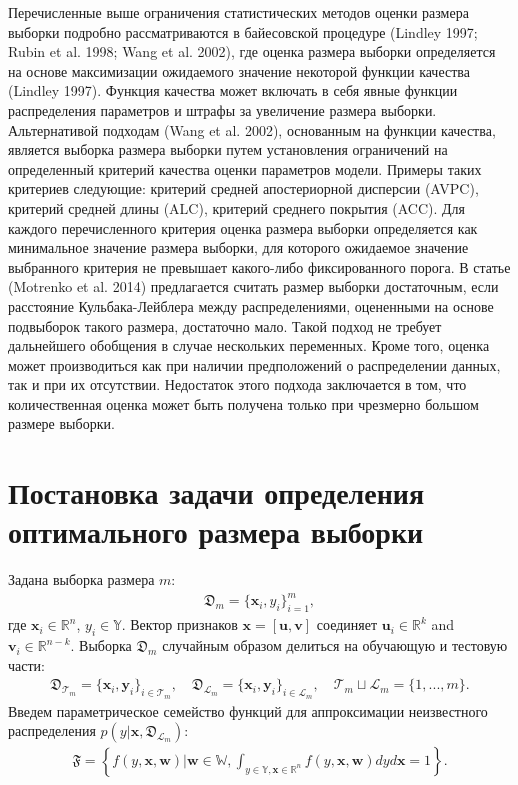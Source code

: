 Перечисленные выше ограничения статистических методов оценки размера выборки подробно рассматриваются в байесовской процедуре (Lindley 1997; Rubin et al. 1998; Wang et al. 2002), где оценка размера выборки определяется на основе максимизации ожидаемого значение некоторой функции качества (Lindley 1997). Функция качества может включать в себя явные функции распределения параметров и штрафы за увеличение размера выборки. Альтернативой подходам (Wang et al. 2002), основанным на функции качества, является выборка размера выборки путем установления ограничений на определенный критерий качества оценки параметров модели. Примеры таких критериев следующие: критерий средней апостериорной дисперсии (AVPC), критерий средней длины (ALC), критерий среднего покрытия (ACC). Для каждого перечисленного критерия оценка размера выборки определяется как минимальное значение размера выборки, для которого ожидаемое значение выбранного критерия не превышает какого-либо фиксированного порога. В статье (Motrenko et al. 2014) предлагается считать размер выборки достаточным, если расстояние Кульбака-Лейблера между распределениями, оцененными на основе подвыборок такого размера, достаточно мало. Такой подход не требует дальнейшего обобщения в случае нескольких переменных. Кроме того, оценка может производиться как при наличии предположений о распределении данных, так и при их отсутствии. Недостаток этого подхода заключается в том, что количественная оценка может быть получена только при чрезмерно большом размере выборки.

\section{Постановка задачи определения оптимального размера выборки}

Задана выборка размера $m$:
\[
\label{eq:ps:1}
\begin{aligned}
	\mathfrak{D}_{m} = \{\textbf{x}_i, y_i\}_{i = 1}^{m},
\end{aligned}
\]
где $\textbf{x}_i\in \mathbb{R}^{n}$, $y_i\in \mathbb{Y}$. Вектор признаков $\textbf{x} = [\textbf{u}, \textbf{v}]$ соединяет $\textbf{u}_i\in \mathbb{R}^{k}$ and $ \textbf{v}_i\in \mathbb{R}^{n-k}$.
Выборка $\mathfrak{D}_{m}$ случайным образом делиться на обучающую и тестовую части:
\[
\label{eq:ps:2}
\begin{aligned}
	\mathfrak{D}_{\mathcal{T}_{m}} = \{\textbf{x}_i, \textbf{y}_i\}_{i \in \mathcal{T}_{m}}, \quad \mathfrak{D}_{\mathcal{L}_{m}} = \{\textbf{x}_i, \textbf{y}_i\}_{i \in \mathcal{L}_{m}}, \quad  \mathcal{T}_{m}\sqcup\mathcal{L}_{m} = \{1, ..., m\}.
\end{aligned}
\]
Введем параметрическое семейство функций для аппроксимации неизвестного распределения $p(y|\textbf{x}, \mathfrak{D}_{\mathcal{L}_{m}})$:
\[
\label{eq:ps:3}
\begin{aligned}
	\mathfrak{F} = \left\{f\left(y,\textbf{x}, \textbf{w}\right)|\textbf{w}\in\mathbb{W}, \int_{y\in \mathbb{Y}, \textbf{x}\in\mathbb{R}^{n}}f\left(y, \textbf{x}, \textbf{w}\right)dyd\textbf{x}=1\right\}.
\end{aligned}
\]

